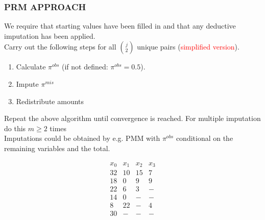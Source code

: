 \documentclass[aspectratio=169]{beamer} %
\begin{document}
\begin{frame}
  \frametitle{PRM APPROACH}
We require that starting values have been filled in and that any deductive imputation has been applied.
\newline \\
Carry out the following steps for all ${j \choose 2}$ unique pairs (\textcolor{red}{simplified version}).
\begin{enumerate}
	\item Calculate $\pi^{obs}$ (if not defined: $\pi^{obs} = 0.5$). 
	\item Impute $\pi^{mis}$ 
	\item Redistribute amounts
\end{enumerate}
Repeat the above algorithm until convergence is reached. For multiple imputation do this $m\geq2$ times
\newline \\
Imputations could be obtained by e.g. PMM with $\pi^{obs}$ conditional on the remaining variables and the total.		
\end{frame}

%

\begin{frame}
\huge
\begin{equation*}
\begin{array}{cccc}
x_0 &x_1   & x_2  & x_3    \\
32 	&10   & 15  	& 7	\\
18 	&0	&9		&9	\\
22 	&6	& 3		& -	\\
14 	&0	&-		&-	\\
8	&22	&-		&4	\\
30 	&-	&-		&-	\\
\end{array}
\end{equation*}
\end{frame}  
  
\end{document}
